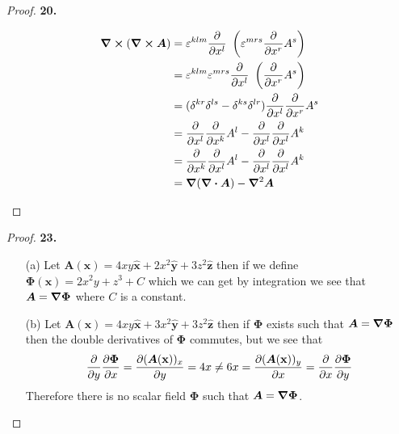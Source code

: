 \documentclass[11pt]{article}
\newcommand{\hatx}{\bm{\hat{x}}}
\newcommand{\haty}{\bm{\hat{y}}}
\newcommand{\hatz}{\bm{\hat{z}}}
\theoremstyle{definition}
\begin{document}
\begin{proof}{\textbf{20.}}
\begin{itemize}
        \begin{align*}
            \curl (\curl\bm{A}) &=
            \varepsilon^{klm}\partialderivative{}{x^l}~\left(
                \varepsilon^{mrs}\partialderivative{}{x^r}A^s
            \right)\\
            &=\varepsilon^{klm}\varepsilon^{mrs}
            \partialderivative{}{x^l}~\left(
                \partialderivative{}{x^r}A^s
            \right)\\
            &= (\delta^{kr}\delta^{ls} - \delta^{ks}\delta^{lr})
            \partialderivative{}{x^l}\partialderivative{}{x^r}A^s\\
            &=
            \partialderivative{}{x^l}\partialderivative{}{x^k}A^l
            - \partialderivative{}{x^l}\partialderivative{}{x^l}A^k\\
            &=
            \partialderivative{}{x^k}\partialderivative{}{x^l}A^l
            - \partialderivative{}{x^l}\partialderivative{}{x^l}A^k\\
            &= \grad(\div \bm{A}) - \grad^2\bm{A}
        \end{align*}
    \end{itemize}
\end{proof}
\cleardoublepage
\begin{proof}{\textbf{23.}}
    \begin{itemize}
        \item [(a)]
        Let $\bm A(\mathbf{x}) = 4xy\hatx + 2x^2\haty + 3z^2\hatz$
        then if we define
        $\bm{\Phi}(\mathbf{x}) = 2x^2y + z^3 + C$ which we can get by
        integration we see that
        $\bm{A} = \grad \bm{\Phi}$ where $C$ is a constant. 
        \item [(b)] Let $\bm A(\mathbf{x}) = 4xy\hatx + 3x^2\haty + 3z^2\hatz$
        then if $\bm{\Phi}$ exists such that $\bm{A} = \grad\bm{\Phi}$ then
        the double derivatives of $\bm{\Phi}$ commutes, but we see that
        \begin{align*}
            \partialderivative{}{y}\partialderivative{\bm{\Phi}}{x}
            = \partialderivative{(\bm{A}(\mathbf{x}))_x}{y}
            = 4x \neq 6x
            = \partialderivative{(\bm{A}(\mathbf{x}))_y}{x}
            = \partialderivative{}{x}\partialderivative{\bm{\Phi}}{y}
        \end{align*} 
        Therefore there is no scalar field $\bm{\Phi}$ such that
        $\bm{A} = \grad\bm{\Phi}$.
    \end{itemize}
\end{proof}
\end{document}
